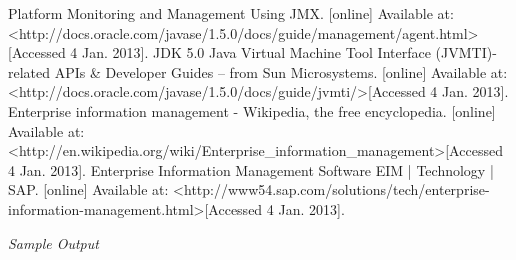 \documentclass{llncs}
\begin{document}
\begin{thebibliography}{}
 Platform Monitoring and Management Using JMX. [online] Available at: \textless http://docs.oracle.com/javase/1.5.0/docs/guide/management/agent.html\textgreater [Accessed 4 Jan. 2013].
 JDK 5.0 Java Virtual Machine Tool Interface (JVMTI)-related APIs \& Developer Guides -- from Sun Microsystems. [online] Available at: \textless http://docs.oracle.com/javase/1.5.0/docs/guide/jvmti/\textgreater [Accessed 4 Jan. 2013].
 Enterprise information management - Wikipedia, the free encyclopedia. [online] Available at: \textless http://en.wikipedia.org/wiki/Enterprise\_information\_management\textgreater [Accessed 4 Jan. 2013].
 Enterprise Information Management Software EIM | Technology | SAP. [online] Available at: \textless http://www54.sap.com/solutions/tech/enterprise-information-management.html\textgreater [Accessed 4 Jan. 2013].
\end{thebibliography}

{\itshape Sample Output}
\bibauthoryear
%
\end{document}
